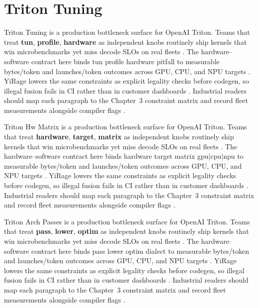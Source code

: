 \section{Triton Tuning}
\label{sec:triton_tuning}

Triton Tuning is a production bottleneck surface for OpenAI Triton. Teams that treat \textbf{tun}, \textbf{profile}, \textbf{hardware} as independent knobs routinely ship kernels that win microbenchmarks yet miss decode SLOs on real fleets \citep{nvidia2022hopper,amd2024aie}. The hardware--software contract here binds tun profile hardware pitfall to measurable bytes/token and launches/token outcomes across GPU, CPU, and NPU targets \citep{semianalysis2024tma,dlbook}. YiRage lowers the same constraints as explicit legality checks before codegen, so illegal fusion fails in CI rather than in customer dashboards \citep{amd2024xdna,dao2022flashattention}. Industrial readers should map each paragraph to the Chapter~3 constraint matrix and record fleet measurements alongside compiler flags \citep{amd2024aie,kwon2023vllm}.

Triton Hw Matrix is a production bottleneck surface for OpenAI Triton. Teams that treat \textbf{hardware}, \textbf{target}, \textbf{matrix} as independent knobs routinely ship kernels that win microbenchmarks yet miss decode SLOs on real fleets \citep{taxbreak2026,semianalysis2024tma}. The hardware--software contract here binds hardware target matrix gpu|cpu|npu to measurable bytes/token and launches/token outcomes across GPU, CPU, and NPU targets \citep{memoryfloor2026,amd2024xdna}. YiRage lowers the same constraints as explicit legality checks before codegen, so illegal fusion fails in CI rather than in customer dashboards \citep{nvidia2022hopper,amd2024aie}. Industrial readers should map each paragraph to the Chapter~3 constraint matrix and record fleet measurements alongside compiler flags \citep{semianalysis2024tma,dlbook}.

Triton Arch Passes is a production bottleneck surface for OpenAI Triton. Teams that treat \textbf{pass}, \textbf{lower}, \textbf{optim} as independent knobs routinely ship kernels that win microbenchmarks yet miss decode SLOs on real fleets \citep{memoryfloor2026,amd2024xdna}. The hardware--software contract here binds pass lower optim dialect to measurable bytes/token and launches/token outcomes across GPU, CPU, and NPU targets \citep{nvidia2022hopper,amd2024aie}. YiRage lowers the same constraints as explicit legality checks before codegen, so illegal fusion fails in CI rather than in customer dashboards \citep{semianalysis2024tma,dlbook}. Industrial readers should map each paragraph to the Chapter~3 constraint matrix and record fleet measurements alongside compiler flags \citep{amd2024xdna,dao2022flashattention}.

